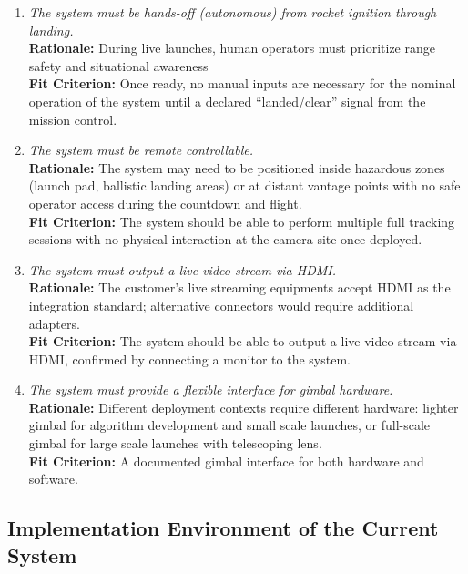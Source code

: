 \documentclass[12pt]{article}
\begin{document}
\begin{enumerate}[label=MD-SL \arabic*., wide=0pt, leftmargin=*]
  \item \emph{The system must be hands-off (autonomous) from rocket ignition through landing.}\\[2mm]
        {\bf Rationale:} During live launches, human operators must prioritize range safety and situational awareness\\
        {\bf Fit Criterion:} Once ready, no manual inputs are necessary for the nominal operation of the system until a declared “landed/clear” signal from the mission control.

  \item \emph{The system must be remote controllable.}\\[2mm]
        {\bf Rationale:} The system may need to be positioned inside hazardous zones (launch pad, ballistic landing areas) or at distant vantage points with no safe operator access during the countdown and flight.\\
        {\bf Fit Criterion:} The system should be able to perform multiple full tracking sessions with no physical interaction at the camera site once deployed.

  \item \emph{The system must output a live video stream via HDMI.}\\[2mm]
        {\bf Rationale:} The customer's live streaming equipments accept HDMI as the integration standard; alternative connectors would require additional adapters.\\
        {\bf Fit Criterion:} The system should be able to output a live video stream via HDMI, confirmed by connecting a monitor to the system.

  \item \emph{The system must provide a flexible interface for gimbal hardware.}\\[2mm]
        {\bf Rationale:} Different deployment contexts require different hardware: lighter gimbal for algorithm development and small scale launches, or full-scale gimbal for large scale launches with telescoping lens.\\
        {\bf Fit Criterion:} A documented gimbal interface for both hardware and software.
\end{enumerate}

\subsection{Implementation Environment of the Current System}
\end{document}
